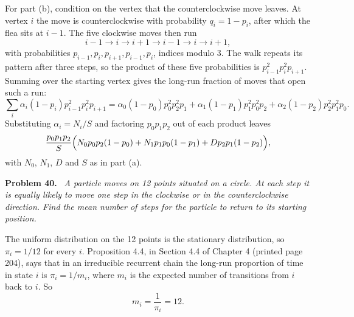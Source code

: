 \documentclass[11pt]{article}
\newenvironment{problem}[1]
  {\par\medskip\noindent\textbf{Problem #1.}\ \itshape}
  {\par\medskip}
\begin{document}
For part (b), condition on the vertex that the counterclockwise move leaves. At vertex $i$ the move is counterclockwise with probability $q_i=1-p_i$, after which the flea sits at $i-1$. The five clockwise moves then run
\[
i-1\to i\to i+1\to i-1\to i\to i+1,
\]
with probabilities $p_{i-1},p_i,p_{i+1},p_{i-1},p_i$, indices modulo $3$. The walk repeats its pattern after three steps, so the product of these five probabilities is $p_{i-1}^2p_i^2p_{i+1}$. Summing over the starting vertex gives the long-run fraction of moves that open such a run:
\[
\sum_i\alpha_i(1-p_i)p_{i-1}^2p_i^2p_{i+1}
=\alpha_0(1-p_0)p_0^2p_2^2p_1+\alpha_1(1-p_1)p_1^2p_0^2p_2+\alpha_2(1-p_2)p_2^2p_1^2p_0.
\]
Substituting $\alpha_i=N_i/S$ and factoring $p_0p_1p_2$ out of each product leaves
\[
\frac{p_0p_1p_2}{S}\Bigl(N_0p_0p_2(1-p_0)+N_1p_1p_0(1-p_1)+Dp_2p_1(1-p_2)\Bigr),
\]
with $N_0$, $N_1$, $D$ and $S$ as in part (a).

\begin{problem}{40}
A particle moves on 12 points situated on a circle. At each step it is equally likely to move one step in the clockwise or in the counterclockwise direction. Find the mean number of steps for the particle to return to its starting position.
\end{problem}
The uniform distribution on the 12 points is the stationary distribution, so $\pi_i = 1/12$ for every $i$. Proposition 4.4, in Section 4.4 of Chapter 4 (printed page 204), says that in an irreducible recurrent chain the long-run proportion of time in state $i$ is $\pi_i=1/m_i$, where $m_i$ is the expected number of transitions from $i$ back to $i$. So
$$m_i = \frac{1}{\pi_i} = 12.$$
\end{document}

